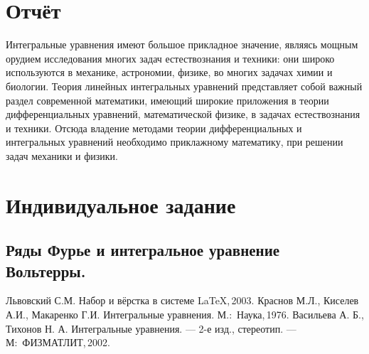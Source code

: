 \documentclass[12pt]{article}
\begin{document}
\newpage
\section{Отчёт}
Интегральные уравнения имеют большое прикладное значение, являясь мощным
орудием исследования многих задач естествознания и техники: они широко используются
в механике, астрономии, физике, во многих задачах химии и биологии. Теория линейных
интегральных уравнений представляет собой важный раздел современной математики,
имеющий широкие приложения в теории дифференциальных уравнений, математической
физике, в задачах естествознания и техники. Отсюда владение методами теории
дифференциальных и интегральных уравнений необходимо приклажному математику, при решении задач
механики и физики.

\newpage
\section{Индивидуальное задание}


\subsection{Ряды Фурье и интегральное уравнение Вольтерры.}



\newpage
{}
\begin{thebibliography}{99}
 Львовский С.М. Набор и вёрстка в системе \LaTeX,\,2003.
 Краснов М.Л., Киселев А.И., Макаренко Г.И. Интегральные уравнения. М.:~Наука,\,1976.
 Васильева А. Б., Тихонов Н. А. Интегральные уравнения. --- 2-е изд., стереотип. --- М:~ФИЗМАТЛИТ,\,2002.
\end{thebibliography}
\end{document}
